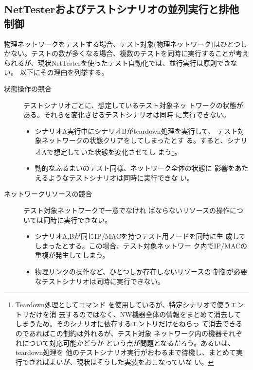   \subsection{NetTesterおよびテストシナリオの並列実行と排他制御}
  \label{sec:testscenario-excl-ctrl}

物理ネットワークをテストする場合、テスト対象(物理ネットワーク)はひとつし
かない。テストの数が多くなる場合、複数のテストを同時に実行することが考え
られるが、現状NetTesterを使ったテスト自動化では、並行実行は原則できない。
以下にその理由を列挙する。

\begin{description}
 \item[状態操作の競合] テストシナリオごとに、想定しているテスト対象ネッ
            トワークの状態がある。それらを変化させるテストシナリオは同時
            に実行できない。
            \begin{itemize}
             \item シナリオA実行中にシナリオBがteardown処理を実行して、
                   テスト対象ネットワークの状態クリアをしてしまったとす
                   る。すると、シナリオAで想定していた状態を変化させてし
                   まう\footnote{Teardown処理としてコマンド
                   を使用しているが、特定シナリオで使うエントリだけを消
                   去するのではなく、NW機器全体の情報をまとめて消去して
                   しまうため。そのシナリオに依存するエントリだけをねらっ
                   て消去できるのであればこの制約は外れるが、テスト対象
                   ネットワーク内の機器それぞれについて対応可能かどうか
                   という点が問題となるだろう。あるいは、teardown処理を
                   他のテストシナリオ実行がおわるまで待機し、まとめて実
                   行できればよいが、現状はそうした実装をおこなっていな
                   い。}。
             \item 動的なふるまいのテスト同様、ネットワーク全体の状態に
                   影響をあたえるようなテストシナリオは同時に実行できな
                   い。
            \end{itemize}
 \item[ネットワークリソースの競合] テスト対象ネットワークで一意でなけれ
            ばならないリソースの操作については同時に実行できない。
            \begin{itemize}
             \item シナリオA,Bが同じIP/MACを持つテスト用ノードを同時に生
                   成してしまったとする。この場合、テスト対象ネットワー
                   ク内でIP/MACの重複が発生してしまう。
             \item 物理リンクの操作など、ひとつしか存在しないリソースの
                   制御が必要なテストシナリオは同時に実行できない。
            \end{itemize}
\end{description}


